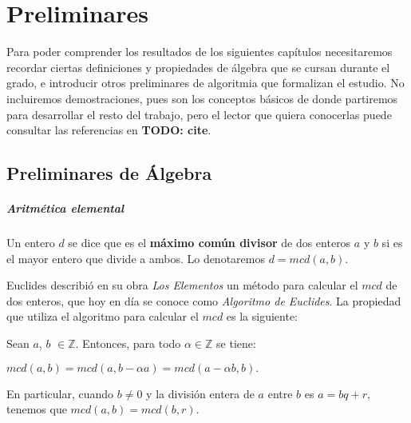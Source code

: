 \chapter{Preliminares}\label{ch:preliminares}


Para poder comprender los resultados de los siguientes capítulos necesitaremos recordar ciertas definiciones y propiedades de álgebra que se cursan durante el grado, e introducir otros preliminares de algoritmia que formalizan el estudio. No incluiremos demostraciones, pues son los conceptos básicos de donde partiremos para desarrollar el resto del trabajo, pero el lector que quiera conocerlas puede consultar las referencias en \textbf{TODO: cite}.

\section{Preliminares de Álgebra}

%

\paragraph{Aritmética elemental}

\begin{definition}
	Un entero $d$ se dice que es el \textbf{máximo común divisor} de dos enteros $a$ y $b$ si es el mayor entero que divide a ambos. Lo denotaremos $d=mcd(a,b)$.
\end{definition}

\hfil

Euclides describió en su obra \textit{Los Elementos} un método para calcular el $mcd$ de dos enteros, que hoy en día se conoce como \textit{Algoritmo de Euclides}. La propiedad que utiliza el algoritmo para calcular el $mcd$ es la siguiente:



\begin{proposition}
	Sean $a$, $b$ $\in \mathbb{Z}$. Entonces, para todo $\alpha \in \mathbb{Z}$ se tiene:
			\begin{center}
				$mcd(a,b) = mcd(a, b-\alpha a) = mcd(a-\alpha b, b).$
			\end{center}
	En particular, cuando $b \neq 0$ y la división entera de $a$ entre $b$ es $a = bq + r$, tenemos que $mcd(a,b) = mcd(b, r)$.
\end{proposition}

